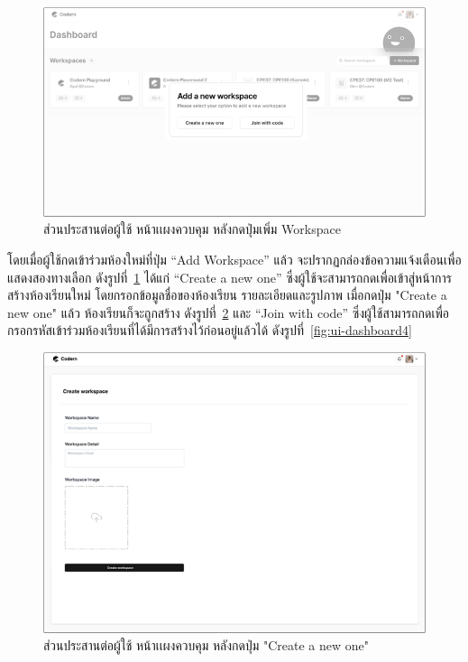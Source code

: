 \documentclass[12pt,one side,openright,a4paper]{cpe-thesis-th}
\newcommand{\thaijustify}[1]{%
  \par\hspace{30pt}\justifying
  #1
}
\begin{document}
    \hypertarget{ui-dashboard2}{
        \begin{figure}[H]
        \centering
            \includegraphics[width=15cm]{figure/ui/ui-dashboard2.png}
            \caption[ส่วนประสานต่อผู้ใช้ หน้าแผงควบคุม (กดเพิ่ม Workspace)]{ส่วนประสานต่อผู้ใช้ หน้าเเผงควบคุม หลังกดปุ่มเพิ่ม Workspace}
            \label{fig:ui-dashboard2}
        \end{figure}
    }
    \thaijustify{
        โดยเมื่อผู้ใช้กดเข้าร่วมห้องใหม่ที่ปุ่ม “Add Workspace” แล้ว จะปรากฏกล่องข้อความแจ้งเตือนเพื่อแสดงสองทางเลือก ดังรูปที่~\ref{fig:ui-dashboard2} ได้แก่ “Create a new one” ซึ่งผู้ใช้จะสามารถกดเพื่อเข้าสู่หน้าการสร้างห้องเรียนใหม่ โดยกรอกข้อมูลชื่อของห้องเรียน รายละเอียดและรูปภาพ เมื่อกดปุ่ม "Create a new one" แล้ว ห้องเรียนก็จะถูกสร้าง ดังรูปที่~\ref{fig:ui-dashboard3} และ “Join with code” ซึ่งผู้ใช้สามารถกดเพื่อกรอกรหัสเข้าร่วมห้องเรียนที่ได้มีการสร้างไว้ก่อนอยู่แล้วได้ ดังรูปที่~\ref{fig:ui-dashboard4}
    }


    \hypertarget{ui-dashboard3}{
        \begin{figure}[H]
        \centering
            \includegraphics[width=15cm]{figure/ui/ui-dashboard3.png}
            \caption[ส่วนประสานต่อผู้ใช้ หน้าเเผงควบคุม (กดปุ่ม "Create a new one")]{ ส่วนประสานต่อผู้ใช้ หน้าเเผงควบคุม หลังกดปุ่ม "Create a new one"}
            \label{fig:ui-dashboard3}
        \end{figure}
    }
\end{document}
